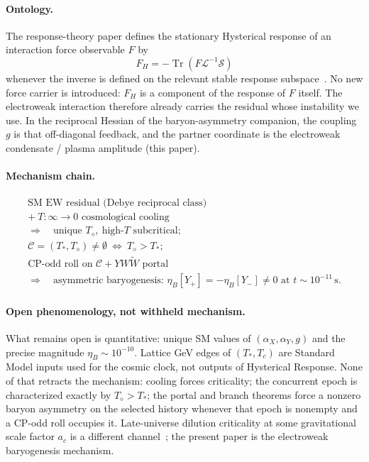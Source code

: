 \documentclass[11pt]{article}
\theoremstyle{definition}
\theoremstyle{remark}
\newcommand{\Td}{T_{\diamond}}
\newcommand{\Tr}{\operatorname{Tr}}
\begin{document}
\paragraph{Ontology.}
The response-theory paper defines the stationary Hysterical response of an
interaction force observable $F$ by
\begin{equation}
\label{eq:FH}
\boxed{F_H=-\Tr\!\left(F\mathcal L^{-1}\mathcal S\right)}
\end{equation}
whenever the inverse is defined on the relevant stable response
subspace~\cite{boyd2026response}.
No new force carrier is introduced: $F_H$ is a component of the response of $F$
itself.
The electroweak interaction therefore already carries the residual whose
instability we use.
In the reciprocal Hessian of the baryon-asymmetry companion, the coupling $g$ is
that off-diagonal feedback, and the partner coordinate is the electroweak
condensate / plasma amplitude (this paper).

\paragraph{Mechanism chain.}
\begin{equation}
\label{eq:target}
\boxed{\begin{gathered}
\text{SM EW residual (Debye reciprocal class)}\\
+\ T:\infty\to0\text{ cosmological cooling}\\
\Longrightarrow\quad
\text{unique }\Td,\ \text{high-$T$ subcritical;}\\
\mathcal C=(T_*,\Td)\neq\emptyset\ \Longleftrightarrow\ \Td>T_*;\\
\text{CP-odd roll on }\mathcal C+YW\widetilde W\text{ portal}\\
\Longrightarrow\quad
\text{asymmetric baryogenesis: }
\eta_B[Y_+]=-\eta_B[Y_-]\neq0
\text{ at }t\sim10^{-11}\,\mathrm{s}.
\end{gathered}}
\end{equation}

\paragraph{Open phenomenology, not withheld mechanism.}
What remains open is quantitative: unique SM values of $(\alpha_X,\alpha_Y,g)$ and
the precise magnitude $\eta_B\sim10^{-10}$.
Lattice GeV edges of $(T_*,T_c)$ are Standard Model inputs used for the cosmic
clock, not outputs of Hysterical Response.
None of that retracts the mechanism: cooling forces criticality; the concurrent
epoch is characterized exactly by $\Td>T_*$; the portal and branch theorems force
a nonzero baryon asymmetry on the selected history whenever that epoch is
nonempty and a CP-odd roll occupies it.
Late-universe dilution criticality at some gravitational scale factor $a_c$ is a
different channel~\cite{boyd2026late}; the present paper is the electroweak
baryogenesis mechanism.
\end{document}
